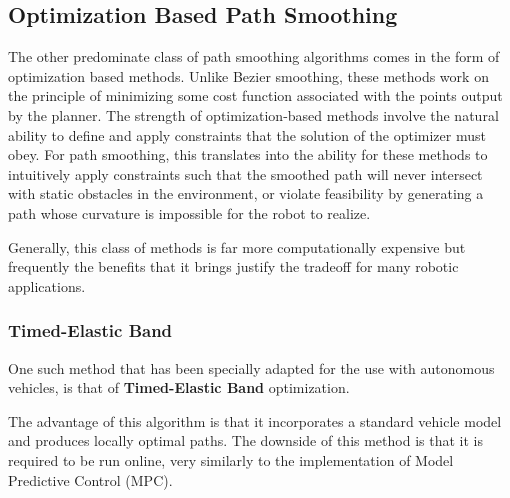 \subsection{Optimization Based Path Smoothing}
The other predominate class of path smoothing algorithms comes in the form of optimization based methods. Unlike Bezier smoothing, these methods work on the principle of minimizing some cost function associated with the points output by the planner. The strength of optimization-based methods involve the natural ability to define and apply constraints that the solution of the optimizer must obey. For path smoothing, this translates into the ability for these methods to intuitively apply constraints such that the smoothed path will never intersect with static obstacles in the environment, or violate feasibility by generating a path whose curvature is impossible for the robot to realize.

Generally, this class of methods is far more computationally expensive but frequently the benefits that it brings justify the tradeoff for many robotic applications. 

\newline
\subsubsection{Timed-Elastic Band}
One such method that has been specially adapted for the use with autonomous vehicles, is that of \textbf{Timed-Elastic Band} optimization.   



The advantage of this algorithm is that it incorporates a standard vehicle model and produces locally optimal paths. The downside of this method is that it is required to be run online, very similarly to the implementation of Model Predictive Control (MPC).



